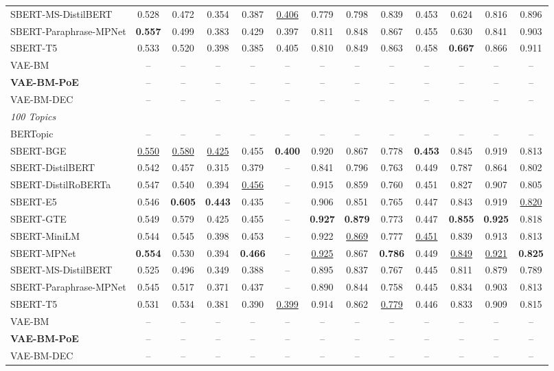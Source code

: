 \begin{table}[t]
{\begin{tabular}{lcccccccccccc}
SBERT-MS-DistilBERT & 0.528 & 0.472 & 0.354 & 0.387 & \underline{0.406} & 0.779 & 0.798 & 0.839 & 0.453 & 0.624 & 0.816 & 0.896 \\
SBERT-Paraphrase-MPNet & \textbf{0.557} & 0.499 & 0.383 & 0.429 & 0.397 & 0.811 & 0.848 & 0.867 & 0.455 & 0.630 & 0.841 & 0.903 \\
SBERT-T5 & 0.533 & 0.520 & 0.398 & 0.385 & 0.405 & 0.810 & 0.849 & 0.863 & 0.458 & \textbf{0.667} & 0.866 & 0.911 \\
\midrule
VAE-BM & -- & -- & -- & -- & -- & -- & -- & -- & -- & -- & -- & -- \\
\textbf{VAE-BM-PoE} & -- & -- & -- & -- & -- & -- & -- & -- & -- & -- & -- & -- \\
VAE-BM-DEC & -- & -- & -- & -- & -- & -- & -- & -- & -- & -- & -- & -- \\
\midrule
\multicolumn{13}{l}{\textit{100 Topics}} \\
BERTopic & -- & -- & -- & -- & -- & -- & -- & -- & -- & -- & -- & -- \\
SBERT-BGE & \underline{0.550} & \underline{0.580} & \underline{0.425} & 0.455 & \textbf{0.400} & 0.920 & 0.867 & 0.778 & \textbf{0.453} & 0.845 & 0.919 & 0.813 \\
SBERT-DistilBERT & 0.542 & 0.457 & 0.315 & 0.379 & -- & 0.841 & 0.796 & 0.763 & 0.449 & 0.787 & 0.864 & 0.802 \\
SBERT-DistilRoBERTa & 0.547 & 0.540 & 0.394 & \underline{0.456} & -- & 0.915 & 0.859 & 0.760 & 0.451 & 0.827 & 0.907 & 0.805 \\
SBERT-E5 & 0.546 & \textbf{0.605} & \textbf{0.443} & 0.435 & -- & 0.906 & 0.851 & 0.765 & 0.447 & 0.843 & 0.919 & \underline{0.820} \\
SBERT-GTE & 0.549 & 0.579 & 0.425 & 0.455 & -- & \textbf{0.927} & \textbf{0.879} & 0.773 & 0.447 & \textbf{0.855} & \textbf{0.925} & 0.818 \\
SBERT-MiniLM & 0.544 & 0.545 & 0.398 & 0.453 & -- & 0.922 & \underline{0.869} & 0.777 & \underline{0.451} & 0.839 & 0.913 & 0.813 \\
SBERT-MPNet & \textbf{0.554} & 0.530 & 0.394 & \textbf{0.466} & -- & \underline{0.925} & 0.867 & \textbf{0.786} & 0.449 & \underline{0.849} & \underline{0.921} & \textbf{0.825} \\
SBERT-MS-DistilBERT & 0.525 & 0.496 & 0.349 & 0.388 & -- & 0.895 & 0.837 & 0.767 & 0.445 & 0.811 & 0.879 & 0.789 \\
SBERT-Paraphrase-MPNet & 0.545 & 0.517 & 0.371 & 0.437 & -- & 0.890 & 0.844 & 0.758 & 0.445 & 0.834 & 0.903 & 0.813 \\
SBERT-T5 & 0.531 & 0.534 & 0.381 & 0.390 & \underline{0.399} & 0.914 & 0.862 & \underline{0.779} & 0.446 & 0.833 & 0.909 & 0.815 \\
\midrule
VAE-BM & -- & -- & -- & -- & -- & -- & -- & -- & -- & -- & -- & -- \\
\textbf{VAE-BM-PoE} & -- & -- & -- & -- & -- & -- & -- & -- & -- & -- & -- & -- \\
VAE-BM-DEC & -- & -- & -- & -- & -- & -- & -- & -- & -- & -- & -- & -- \\
\bottomrule
\end{tabular}
}
\end{table}
